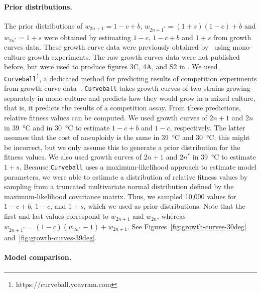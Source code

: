 \documentclass[12pt]{extarticle}
\begin{document}
\paragraph{Prior distributions.} The prior distributions of $w_{2n+1}=1-c+b$, $w_{2n+1^*}=(1+s)(1-c)+b$ and $w_{2n^*}=1+s$ were obtained by estimating $1-c$, $1-c+b$ and $1+s$ from growth curves data. These growth curve data were previously obtained by~\citet{Yona2012} using mono-culture growth experiments.
The raw growth curves data were not published before, but were used to produce figures 3C, 4A, and S2 in \citet{Yona2012}.
We used \texttt{Curveball}\footnote{https://curveball.yoavram.com}, a dedicated method for predicting results of competition experiments from growth curve data~\citep{Ram2019}. \texttt{Curveball} takes growth curves of two strains growing separately in mono-culture and predicts how they would grow in a mixed culture, that is, it predicts the results of a competition assay.
From these predictions, relative fitness values can be computed.  
We used growth curves of $2n+1$ and $2n$ in \SI{39}{\celsius} and in \SI{30}{\celsius} to estimate $1-c+b$ and $1-c$, respectively. The latter assumes that the cost of aneuploidy is the same in \SI{39}{\celsius} and \SI{30}{\celsius}; this might be incorrect, but we only assume this to generate a prior distribution for the fitness values. We also used growth curves of $2n+1$ and $2n^*$ in \SI{39}{\celsius} to estimate $1+s$. 
Because \texttt{Curveball} uses a maximum-likelihood approach to estimate model parameters, we were able to estimate a distribution of relative fitness values by sampling from a truncated multivariate normal distribution defined by the maximum-likelihood covariance matrix. Thus, we sampled 10,000 values for $1-c+b$, $1-c$, and $1+s$, which we used as prior distributions. Note that the first and last values correspond to $w_{2n+1}$ and $w_{2n}$, whereas $w_{2n+1^*}=(1-c)(w_{2n^*}-1)+w_{2n+1}$.
See Figures~\ref{fig:growth-curves-30deg} and~\ref{fig:growth-curves-39deg}.

\paragraph{Model comparison.}  %

\pagebreak
\end{document}
